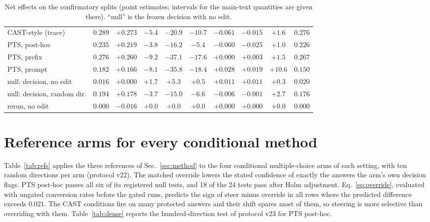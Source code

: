 \begin{table}[h]
{\begin{tabular}{l|cc|ccc|cc|cc}
CAST-style (trace) & $0.289$ & $+0.273$ & $-5.4$ & $-20.9$ & $-10.7$ & $-0.061$ & $-0.015$ & $+1.6$ & $0.276$ \\
PTS, post-hoc & $0.235$ & $+0.219$ & $-3.8$ & $-16.2$ & $-5.4$ & $-0.060$ & $-0.025$ & $+1.0$ & $0.226$ \\
PTS, prefix & $0.276$ & $+0.260$ & $-9.2$ & $-37.1$ & $-17.6$ & $+0.000$ & $+0.003$ & $+1.5$ & $0.267$ \\
PTS, prompt & $0.182$ & $+0.166$ & $-8.1$ & $-35.8$ & $-18.4$ & $+0.028$ & $+0.019$ & $+10.6$ & $0.150$ \\
null: decision, no edit & $0.016$ & $+0.000$ & $+1.7$ & $+5.3$ & $+0.5$ & $+0.011$ & $+0.011$ & $+0.3$ & $0.020$ \\
null: decision, random dir. & $0.194$ & $+0.178$ & $-3.7$ & $-15.0$ & $-6.6$ & $-0.006$ & $-0.001$ & $+2.7$ & $0.176$ \\
rerun, no edit & $0.000$ & $-0.016$ & $+0.0$ & $+0.0$ & $+0.0$ & $+0.000$ & $+0.000$ & $+0.0$ & $0.000$ \\
\hline
\end{tabular}}
\caption{Net effects on the confirmatory splits (point estimates; intervals for
the main-text quantities are given there). ``null'' is the frozen decision with
no edit.}
\label{tab:net}
\end{table}

\section{Reference arms for every conditional method}
\label{app:refs}

Table~\ref{tab:refs} applies the three references of Sec.~\ref{sec:method} to
the four conditional multiple-choice arms of each setting, with ten random
directions per arm (protocol v22). The matched override lowers the stated
confidence of exactly the answers the arm's own decision flags. PTS post-hoc
passes all six of its registered null tests, and 18 of the 24 tests pass after
Holm adjustment. Eq.~\eqref{eq:override}, evaluated with ungated conversion
rates before the gated runs, predicts the sign of steer minus override in all
rows where the predicted difference exceeds $0.021$. The CAST conditions fire
on many protected answers and their shift spares most of them, so steering is
more selective than overriding with them. Table~\ref{tab:dense} reports the hundred-direction test of
protocol v23 for PTS post-hoc.


